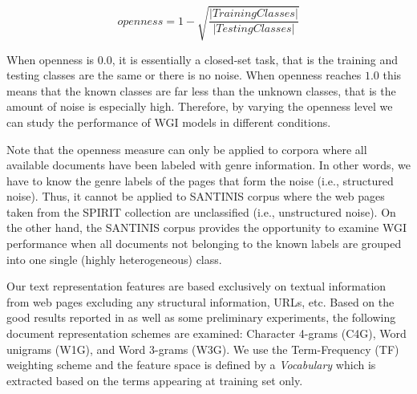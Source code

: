 \documentclass[runningheads]{llncs}
\begin{document}
\hfill \break

\begin{equation}\label{eq:openness}
	openness=1-\sqrt{\frac{ | Training Classes | }{ |Testing Classes | }}
\end{equation}

\hfill \break

When openness is $0.0$, it is essentially a closed-set task, that is the training and testing classes are the same or there is no noise. When openness reaches $1.0$ this means that the known classes are far less than the unknown classes, that is the amount of noise is especially high. Therefore, by varying the openness level we can study the performance of WGI models in different conditions.

Note that the openness measure can only be applied to corpora where all available documents have been labeled with genre information. In other words, we have to know the genre labels of the pages that form the noise (i.e., structured noise). Thus, it cannot be applied to SANTINIS corpus where the web pages taken from the SPIRIT collection are unclassified (i.e., unstructured noise). On the other hand, the SANTINIS corpus provides the opportunity to examine WGI performance when all documents not belonging to the known labels are grouped into one single (highly heterogeneous) class.

Our text representation features are based exclusively on textual information from web pages excluding any structural information, URLs, etc. Based on the good results reported in \citep{sharoff2010web,pritsos2013open,Asheghi2015} as well as some preliminary experiments, the following document representation schemes are examined: Character 4-grams (C4G), Word unigrams (W1G), and Word 3-grams (W3G). We use the Term-Frequency (TF) weighting scheme  and the feature space is defined by a \textit{Vocabulary} which is extracted based on the terms appearing at training set only.
\end{document}
